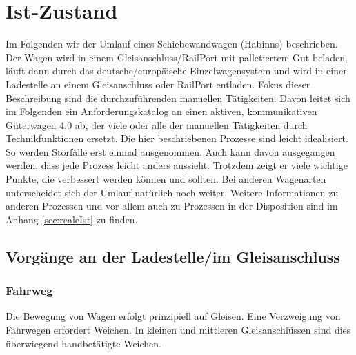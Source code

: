 \section{Ist-Zustand}\label{sec:Istzustand} %
Im Folgenden wir der Umlauf eines \gls{Schiebewandwagen} (Habinns) beschrieben. Der Wagen wird in einem \gls{Gleisanschluss}/RailPort mit palletiertem Gut beladen, läuft dann durch das deutsche/europäische Einzelwagensystem und wird in einer Ladestelle an einem Gleisanschluss oder RailPort entladen. Fokus dieser Beschreibung sind die durchzuführenden manuellen Tätigkeiten. Davon leitet sich im Folgenden ein Anforderungskatalog an einen aktiven, kommunikativen Güterwagen 4.0 ab, der viele oder alle der manuellen Tätigkeiten durch Technikfunktionen ersetzt.
Die hier beschriebenen Prozesse sind leicht idealisiert. So werden Störfälle erst einmal ausgenommen. Auch kann davon ausgegangen werden, dass jede Prozess leicht anders aussieht. Trotzdem zeigt er viele wichtige Punkte, die verbessert werden können und sollten. Bei anderen Wagenarten unterscheidet sich der Umlauf natürlich noch weiter. Weitere Informationen zu anderen Prozessen und vor allem auch zu Prozessen in der Disposition sind im Anhang \ref{sec:realeIst} zu finden. \par
\subsection{Vorgänge an der Ladestelle/im Gleisanschluss}\label{sec:Ladestelle}
\subsubsection{Fahrweg} \label{sec:Fahrweg}
Die Bewegung von Wagen erfolgt prinzipiell auf Gleisen. Eine Verzweigung von Fahrwegen erfordert Weichen. In kleinen und mittleren Gleisanschlüssen sind dies überwiegend handbetätigte Weichen. 
